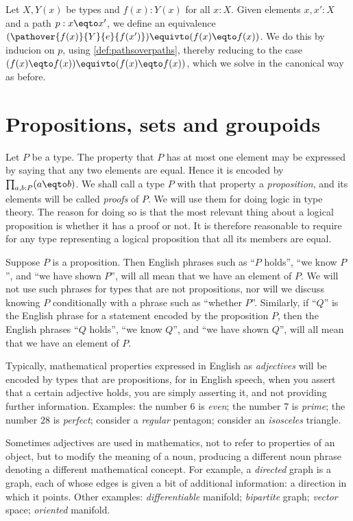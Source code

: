 \begin{definition}\label{def:Dan's-lemma}
Let $X,Y(x)$ be types and $f(x): Y(x)$ for all $x:X$.
Given elements $x,x':X$ and a path $p : x \eqto x'$, we define an equivalence
$(\pathover{f(x)}{Y}{e}{f(x')}) \equivto (f(x) \eqto f(x))$.
We do this by inducion on $p$, using \cref{def:pathsoverpaths},
thereby reducing to the case $(f(x) \eqto f(x)) \equivto (f(x) \eqto f(x))$,
which we solve in the canonical way as before.
\end{definition}


\section{Propositions, sets and groupoids}
\label{sec:props-sets-grpds}

Let $P$ be a type.  The property that $P$ has at most one element may
be expressed by saying that any two elements are equal.
Hence it is encoded by $\prod_{a,b:P} (a \eqto b)$.
We shall call a type $P$ with that property a \emph{proposition},%
and its elements will be called \emph{proofs} of $P$.%
We will use them for doing logic in type theory.
The reason for doing so is that the most relevant
thing about a logical proposition is whether it has a proof or not.
It is therefore reasonable to require for any type representing
a logical proposition that all its members are equal.

Suppose $P$ is a proposition.  Then English phrases such as ``$P$ holds'', ``we know $P$'', and ``we have shown $P$'', will all mean that we
have an element of $P$.  We will not use such phrases for types that are not propositions, nor will we discuss knowing $P$ conditionally with a
phrase such as ``whether $P$''.  Similarly, if ``$Q$'' is the English phrase for a statement encoded by the proposition $P$, then the English
phrases ``$Q$ holds'', ``we know $Q$'', and ``we have shown $Q$'', will all mean that we have an element of $P$.

Typically, mathematical properties expressed in English as \emph{adjectives} will be encoded by types that are propositions, for in English
speech, when you assert that a certain adjective holds, you are simply asserting it, and not providing further information.  Examples: the
number $6$ is \emph{even}; the number $7$ is \emph{prime}; the number $28$ is \emph{perfect}; consider a \emph{regular} pentagon; consider an
\emph{isosceles} triangle.

Sometimes adjectives are used in mathematics, not to refer to properties of an object, but to modify the meaning of a noun, producing a
different noun phrase denoting a different mathematical concept.  For example, a \emph{directed} graph is a graph, each of whose edges is given
a bit of additional information: a direction in which it points.  Other examples: \emph{differentiable} manifold; \emph{bipartite} graph;
\emph{vector} space; \emph{oriented} manifold.

